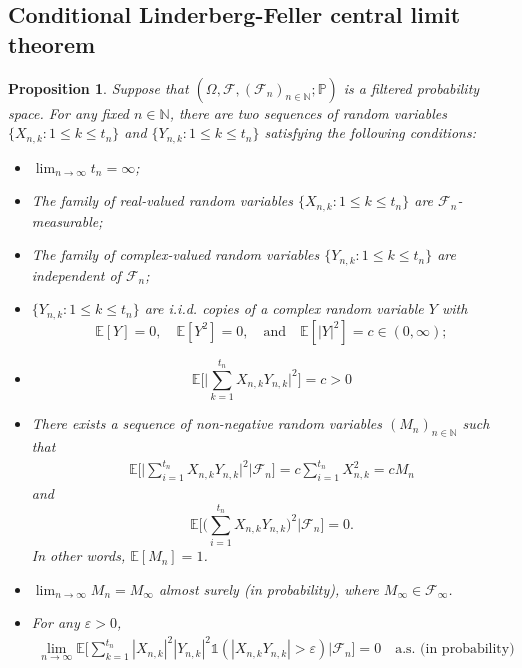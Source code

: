 \documentclass[12pt]{amsart}
\newtheorem{proposition}[theorem]{Proposition}
\theoremstyle{definition}
\theoremstyle{remark}
\newcommand{\N}{\mathbb{N}}
\numberwithin{equation}{section}
\begin{document}
\subsection{Conditional Linderberg-Feller central limit theorem}
\begin{proposition}\label{Prop-c-clt}
Suppose that $(\Omega,\mathcal{F}, (\mathcal{F}_n)_{n\in\N};\mathbb{P})$ is  a filtered probability space. For any fixed   $n\in \N$, there are two  sequences of random variables   $\{X_{n,k}: 1\leq k \leq t_n\}$  and  $\{Y_{n,k}: 1\leq k \leq t_n\}$ satisfying the following conditions:
\begin{itemize}
\item[(1)] $\lim_{n\rightarrow\infty} t_n=\infty$;
\item[(2)]  The family of real-valued random variables $\{X_{n,k}: 1\leq k\leq t_n\}$ are $\mathcal{F}_n$-measurable;
\item[(3)] The family of complex-valued random variables $\{Y_{n,k}: 1\leq k\leq t_n\}$ are independent of  $\mathcal{F}_n$; 
\item[(4)]  $\{Y_{n,k}: 1\leq k\leq t_n\}$ are i.i.d. copies of a complex random variable $Y$ with 
\[
\mathbb{E}[Y]=0,\quad \mathbb{E}[Y^2]=0,\quad \text{and}\quad \mathbb{E}[|Y|^2]=c\in (0,\infty);
\] 
\item[(5)]
\[
\mathbb{E}\Big[\Big|\sum_{k=1}^{t_n} X_{n,k}Y_{n,k}\Big|^2\Big]=c>0
\]
\item[(6)] There exists a  sequence of non-negative random variables $(M_n)_{n\in\N}$ such that 
\begin{align}\label{eqn-convergence}
\mathbb{E}\Big[\Big|\sum_{i=1}^{t_n} X_{n,k}Y_{n,k}\Big|^2\big|\mathcal{F}_n\Big]=c\sum_{i=1}^{t_n} X_{n,k}^2=cM_n
\end{align}
and
\[
\mathbb{E}\Big[\Big(\sum_{i=1}^{t_n} X_{n,k}Y_{n,k}\Big)^2\big| \mathcal{F}_n\Big]=0.
\]
In other words, $\mathbb{E}[M_n]=1$.
\item[(7)] $\lim_{n\rightarrow \infty}M_n=M_\infty$ almost surely (in probability), where $M_\infty\in \mathcal{F}_\infty$.
\item[(8)] For any $\varepsilon>0$, 
\begin{align}\label{eqn-hjhi}
\lim_{n\rightarrow\infty} \mathbb{E}\Big[\sum_{k=1}^{t_n} |X_{n,k}|^2|Y_{n,k}|^2\mathds{1}(|X_{n,k}Y_{n,k}|>\varepsilon) \big|  \mathcal{F}_n\Big]=0 \quad  \text{a.s. (in probability)}
\end{align}

\end{itemize}
\end{proposition}
\end{document}
